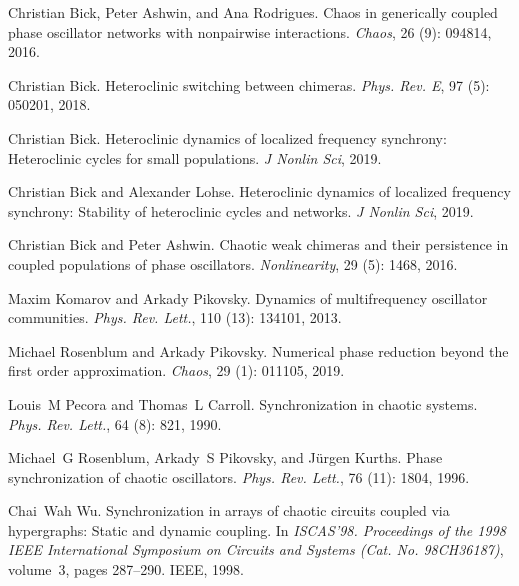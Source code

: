 Christian Bick, Peter Ashwin, and Ana Rodrigues.
\newblock Chaos in generically coupled phase oscillator networks with
nonpairwise interactions.
\newblock \emph{Chaos}, 26 (9): 094814, 2016.

Christian Bick.
\newblock Heteroclinic switching between chimeras.
\newblock \emph{Phys. Rev. E}, 97 (5): 050201, 2018.

Christian Bick.
\newblock Heteroclinic dynamics of localized frequency synchrony:
{{Heteroclinic}} cycles for small populations.
\newblock \emph{J Nonlin Sci}, 2019.

Christian Bick and Alexander Lohse.
\newblock Heteroclinic dynamics of localized frequency synchrony: {{Stability}}
of heteroclinic cycles and networks.
\newblock \emph{J Nonlin Sci}, 2019.

Christian Bick and Peter Ashwin.
\newblock Chaotic weak chimeras and their persistence in coupled populations of
phase oscillators.
\newblock \emph{Nonlinearity}, 29 (5): 1468, 2016.

Maxim Komarov and Arkady Pikovsky.
\newblock Dynamics of multifrequency oscillator communities.
\newblock \emph{Phys. Rev. Lett.}, 110 (13): 134101, 2013.

Michael Rosenblum and Arkady Pikovsky.
\newblock Numerical phase reduction beyond the first order approximation.
\newblock \emph{Chaos}, 29 (1): 011105, 2019.

Louis~M Pecora and Thomas~L Carroll.
\newblock Synchronization in chaotic systems.
\newblock \emph{Phys. Rev. Lett.}, 64 (8): 821, 1990.

Michael~G Rosenblum, Arkady~S Pikovsky, and J{\"u}rgen Kurths.
\newblock Phase synchronization of chaotic oscillators.
\newblock \emph{Phys. Rev. Lett.}, 76 (11): 1804, 1996.

Chai~Wah Wu.
\newblock Synchronization in arrays of chaotic circuits coupled via
hypergraphs: {{Static}} and dynamic coupling.
\newblock In \emph{{{ISCAS}}'98. {{Proceedings}} of the 1998 {{IEEE}}
    International Symposium on Circuits and Systems (Cat. {{No}}.
    {{98CH36187}})}, volume~3, pages 287--290. {IEEE}, 1998.

